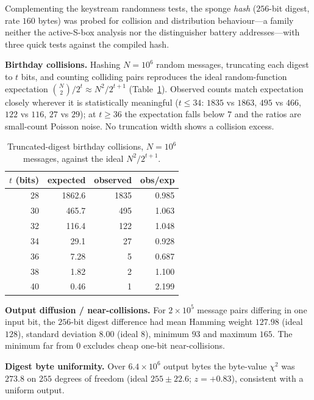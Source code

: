 \documentclass[11pt,a4paper]{article}
\begin{document}
Complementing the keystream randomness tests, the sponge \emph{hash} ($256$-bit
digest, rate $160$ bytes) was probed for collision and distribution behaviour---a
family neither the active-S-box analysis nor the distinguisher battery
addresses---with three quick tests against the compiled hash.

\textbf{Birthday collisions.} Hashing $N=10^{6}$ random messages, truncating each
digest to $t$ bits, and counting colliding pairs reproduces the ideal
random-function expectation $\binom{N}{2}/2^{t}\approx N^{2}/2^{t+1}$
(Table~\ref{tab:birthday}). Observed counts match expectation closely wherever it
is statistically meaningful ($t\le34$: $1835$ vs $1863$, $495$ vs $466$, $122$ vs
$116$, $27$ vs $29$); at $t\ge36$ the expectation falls below $7$ and the ratios
are small-count Poisson noise. No truncation width shows a collision excess.

\begin{table}[h]
\centering
\renewcommand{\arraystretch}{1.15}
\begin{tabular}{rrrr}
  \toprule
  \textbf{$t$ (bits)} & \textbf{expected} & \textbf{observed} & \textbf{obs/exp} \\
  \midrule
  28 & 1862.6 & 1835 & 0.985 \\
  30 &  465.7 &  495 & 1.063 \\
  32 &  116.4 &  122 & 1.048 \\
  34 &   29.1 &   27 & 0.928 \\
  36 &    7.28 &    5 & 0.687 \\
  38 &    1.82 &    2 & 1.100 \\
  40 &    0.46 &    1 & 2.199 \\
  \bottomrule
\end{tabular}
\caption{Truncated-digest birthday collisions, $N=10^{6}$ messages, against the
ideal $N^{2}/2^{t+1}$.}
\label{tab:birthday}
\end{table}

\textbf{Output diffusion / near-collisions.} For $2\times10^{5}$ message pairs
differing in one input bit, the $256$-bit digest difference had mean Hamming
weight $127.98$ (ideal $128$), standard deviation $8.00$ (ideal $8$), minimum
$93$ and maximum $165$. The minimum far from $0$ excludes cheap one-bit
near-collisions.

\textbf{Digest byte uniformity.} Over $6.4\times10^{6}$ output bytes the
byte-value $\chi^{2}$ was $273.8$ on $255$ degrees of freedom (ideal
$255\pm22.6$; $z=+0.83$), consistent with a uniform output.
\end{document}
